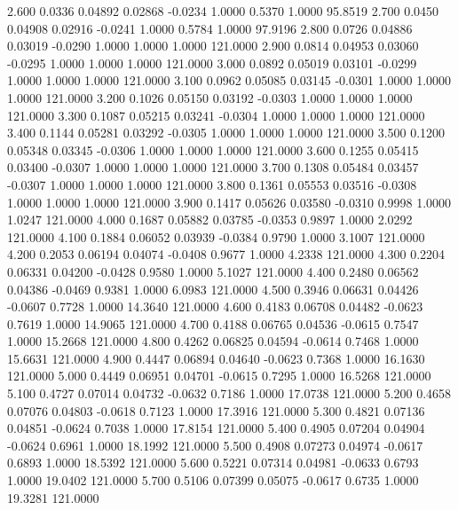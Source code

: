    2.600   0.0336   0.04892   0.02868  -0.0234   1.0000   0.5370   1.0000  95.8519
   2.700   0.0450   0.04908   0.02916  -0.0241   1.0000   0.5784   1.0000  97.9196
   2.800   0.0726   0.04886   0.03019  -0.0290   1.0000   1.0000   1.0000 121.0000
   2.900   0.0814   0.04953   0.03060  -0.0295   1.0000   1.0000   1.0000 121.0000
   3.000   0.0892   0.05019   0.03101  -0.0299   1.0000   1.0000   1.0000 121.0000
   3.100   0.0962   0.05085   0.03145  -0.0301   1.0000   1.0000   1.0000 121.0000
   3.200   0.1026   0.05150   0.03192  -0.0303   1.0000   1.0000   1.0000 121.0000
   3.300   0.1087   0.05215   0.03241  -0.0304   1.0000   1.0000   1.0000 121.0000
   3.400   0.1144   0.05281   0.03292  -0.0305   1.0000   1.0000   1.0000 121.0000
   3.500   0.1200   0.05348   0.03345  -0.0306   1.0000   1.0000   1.0000 121.0000
   3.600   0.1255   0.05415   0.03400  -0.0307   1.0000   1.0000   1.0000 121.0000
   3.700   0.1308   0.05484   0.03457  -0.0307   1.0000   1.0000   1.0000 121.0000
   3.800   0.1361   0.05553   0.03516  -0.0308   1.0000   1.0000   1.0000 121.0000
   3.900   0.1417   0.05626   0.03580  -0.0310   0.9998   1.0000   1.0247 121.0000
   4.000   0.1687   0.05882   0.03785  -0.0353   0.9897   1.0000   2.0292 121.0000
   4.100   0.1884   0.06052   0.03939  -0.0384   0.9790   1.0000   3.1007 121.0000
   4.200   0.2053   0.06194   0.04074  -0.0408   0.9677   1.0000   4.2338 121.0000
   4.300   0.2204   0.06331   0.04200  -0.0428   0.9580   1.0000   5.1027 121.0000
   4.400   0.2480   0.06562   0.04386  -0.0469   0.9381   1.0000   6.0983 121.0000
   4.500   0.3946   0.06631   0.04426  -0.0607   0.7728   1.0000  14.3640 121.0000
   4.600   0.4183   0.06708   0.04482  -0.0623   0.7619   1.0000  14.9065 121.0000
   4.700   0.4188   0.06765   0.04536  -0.0615   0.7547   1.0000  15.2668 121.0000
   4.800   0.4262   0.06825   0.04594  -0.0614   0.7468   1.0000  15.6631 121.0000
   4.900   0.4447   0.06894   0.04640  -0.0623   0.7368   1.0000  16.1630 121.0000
   5.000   0.4449   0.06951   0.04701  -0.0615   0.7295   1.0000  16.5268 121.0000
   5.100   0.4727   0.07014   0.04732  -0.0632   0.7186   1.0000  17.0738 121.0000
   5.200   0.4658   0.07076   0.04803  -0.0618   0.7123   1.0000  17.3916 121.0000
   5.300   0.4821   0.07136   0.04851  -0.0624   0.7038   1.0000  17.8154 121.0000
   5.400   0.4905   0.07204   0.04904  -0.0624   0.6961   1.0000  18.1992 121.0000
   5.500   0.4908   0.07273   0.04974  -0.0617   0.6893   1.0000  18.5392 121.0000
   5.600   0.5221   0.07314   0.04981  -0.0633   0.6793   1.0000  19.0402 121.0000
   5.700   0.5106   0.07399   0.05075  -0.0617   0.6735   1.0000  19.3281 121.0000
